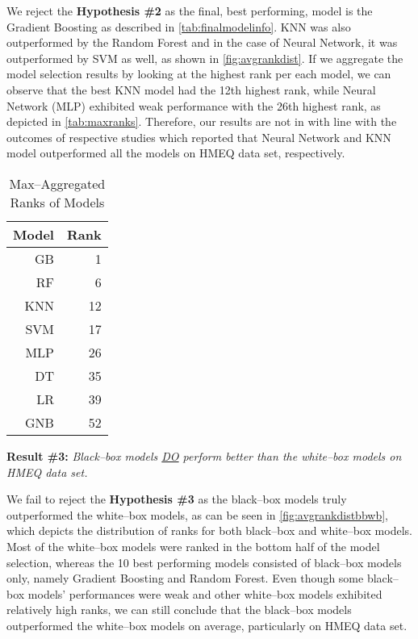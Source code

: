 We reject the \textbf{Hypothesis \#2} as the final, best performing, model is the Gradient Boosting as described in \autoref{tab:finalmodelinfo}.
KNN was also outperformed by the Random Forest and in the case of Neural Network, it was outperformed by SVM as well, as shown in \autoref{fig:avgrankdist}.
If we aggregate the model selection results by looking at the highest rank per each model, we can observe that the best KNN model had the 12th highest rank, while Neural Network (MLP) exhibited weak performance with the 26th highest rank, as depicted in \autoref{tab:maxranks}.
Therefore, our results are not in with line with the outcomes of respective studies \citep{serkan2021bagging,zurada2014classification} which reported that Neural Network and KNN model outperformed all the models on HMEQ data set, respectively.

\begin{table}[H]
    \small
    \setlength{\tabcolsep}{8pt}
    \renewcommand{\arraystretch}{1.3}
    \centering
        \caption[Max--Aggregated Ranks of Models]{Max--Aggregated Ranks of Models}\label{tab:maxranks}
        \begin{tabular}{r r}
    \toprule
    \textbf{Model} & \textbf{Rank}\\
    \midrule
    \hline
    GB & 1 \\ 
    RF & 6 \\ 
    KNN & 12 \\ 
    SVM & 17 \\ 
    MLP & 26 \\ 
    DT & 35 \\ 
    LR & 39 \\
    GNB & 52 \\
    \hline
    \bottomrule
    \end{tabular}
    \vspace{0.35em}

        \vspace{-1em}
\end{table}

\vspace{0.3cm}

\noindent \textbf{Result \#3:} \textit{Black--box models \underline{DO} perform better than the white--box models on HMEQ data set.}

We fail to reject the \textbf{Hypothesis \#3} as the black--box models truly outperformed the white--box models, as can be seen in \autoref{fig:avgrankdistbbwb}, which depicts the distribution of ranks for both black--box and white--box models.
Most of the white--box models were ranked in the bottom half of the model selection, whereas the 10 best performing models consisted of black--box models only, namely Gradient Boosting and Random Forest.
Even though some black--box models' performances were weak and other white--box models exhibited relatively high ranks, we can still conclude that the black--box models outperformed the white--box models on average, particularly on HMEQ data set.
\vspace{0.3cm}

